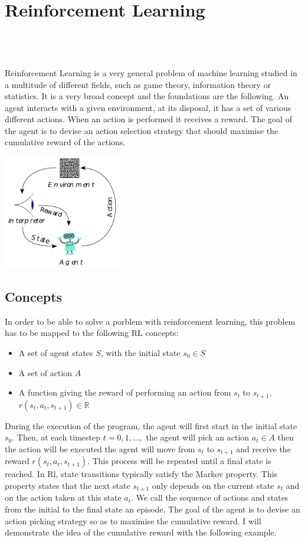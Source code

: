 
\setcounter{chapter}{1}

\chapter{Reinforcement Learning}
\mbox{}\\
\mbox{}\\
\mbox{}\\
Reinforcement Learning is a very general problem of machine learning studied in a multitude of different fields, such as game theory, information theory or statistics. It is a very broad concept and the foundations are the following. An agent interacts with a given environment, at its disposal, it has a set of various different actions. When an action is performed it receives a reward. The goal of the agent is to devise an action selection strategy that should maximise the cumulative reward of the actions.

\begin{center}
	\includegraphics*[height=5cm]{figures/rl_broad.png}
\end{center}

\section{Concepts}
In order to be able to solve a porblem with reinforcement learning, this problem has to be mapped to the following RL concepts:
\begin{itemize}
	\item A set of agent states $S$, with the initial state $s_0\in S$
	\item A set of action $A$
	\item A function giving the reward of performing an action from  $s_t$ to $s_{t+1}$, $r(s_t,a_t,s_{t+1})\in \mathbb{R}$
\end{itemize}
During the execution of the program, the agent will first start in the initial state $s_0$. Then, at each timestep $t=0,1,...,$ the agent will pick an action $a_t \in A$ then the action will be executed the agent will move from $s_t$ to $s_{t+1}$ and receive the reward $r(s_t,a_t,s_{t+1})$. This process will be repeated until a final state is reached. In Rl, state transitions typically satisfy the Markov property. This property states that the next state $s_{t+1}$ only depends on the current state $s_t$ and on the action taken at this state $a_t$. We call the sequence of actions and states from the initial to the final state an episode. The goal of the agent is to devise an action picking strategy so as to maximise the cumulative reward. I will demonstrate the idea of the cumulative reward with the following example.
